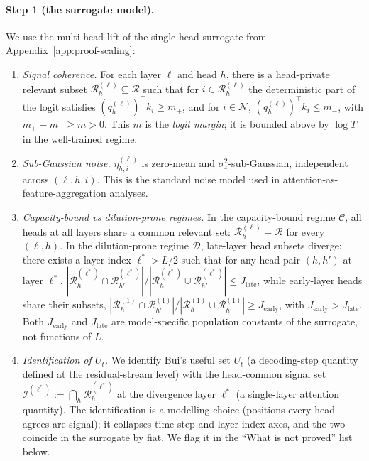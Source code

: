 \documentclass{article}
\begin{document}
\paragraph{Step 1 (the surrogate model).}
We use the multi-head lift of the single-head surrogate from
Appendix~\ref{app:proof-scaling}:
\begin{enumerate}
  \item[\textbf{(A1)}] \emph{Signal coherence.} For each layer $\ell$ and head
  $h$, there is a head-private relevant subset $\mathcal{R}^{(\ell)}_h
  \subseteq \mathcal{R}$ such that for $i \in \mathcal{R}^{(\ell)}_h$ the
  deterministic part of the logit satisfies
  $(q^{(\ell)}_h)^\top k_i \geq m_+$, and for $i \in \mathcal{N}$,
  $(q^{(\ell)}_h)^\top k_i \leq m_-$, with $m_+ - m_- \geq m > 0$.
  This $m$ is the \emph{logit margin}; it is bounded above by $\log T$ in
  the well-trained regime.
  \item[\textbf{(A2)}] \emph{Sub-Gaussian noise.}
  $\eta^{(\ell)}_{h, i}$ is zero-mean and $\sigma_z^2$-sub-Gaussian,
  independent across $(\ell, h, i)$. This is the standard noise model
  used in attention-as-feature-aggregation analyses.
  \item[\textbf{(A3)}] \emph{Capacity-bound vs dilution-prone regimes.}
  In the capacity-bound regime $\mathcal{C}$, all heads at all layers share a
  common relevant set: $\mathcal{R}^{(\ell)}_h = \mathcal{R}$ for every
  $(\ell, h)$. In the dilution-prone regime $\mathcal{D}$, late-layer head
  subsets diverge: there exists a layer index $\ell^* > L/2$ such that for
  any head pair $(h, h')$ at layer $\ell^*$,
  $|\mathcal{R}^{(\ell^*)}_h \cap \mathcal{R}^{(\ell^*)}_{h'}|
  / |\mathcal{R}^{(\ell^*)}_h \cup \mathcal{R}^{(\ell^*)}_{h'}|
  \leq J_{\text{late}}$, while early-layer heads share their subsets,
  $|\mathcal{R}^{(1)}_h \cap \mathcal{R}^{(1)}_{h'}| /
  |\mathcal{R}^{(1)}_h \cup \mathcal{R}^{(1)}_{h'}| \geq J_{\text{early}}$,
  with $J_{\text{early}} > J_{\text{late}}$. Both $J_{\text{early}}$
  and $J_{\text{late}}$ are model-specific population constants of the
  surrogate, not functions of $L$.
  \item[\textbf{(A4)}] \emph{Identification of $U_t$.} We identify Bui's
  useful set $U_t$ (a decoding-step quantity defined at the
  residual-stream level) with the head-common signal set
  $\mathcal{I}^{(\ell^*)} := \bigcap_h \mathcal{R}^{(\ell^*)}_h$ at the
  divergence layer $\ell^*$ (a single-layer attention quantity). The
  identification is a modelling choice (positions every head agrees are
  signal); it collapses time-step and layer-index axes, and the two
  coincide in the surrogate by fiat. We flag it in the ``What is not
  proved'' list below.
\end{enumerate}
\end{document}
